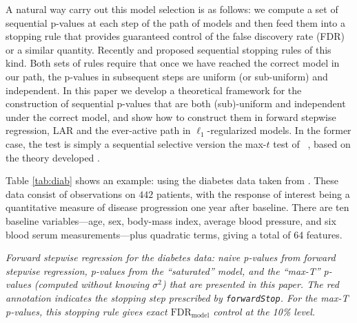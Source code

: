\documentclass{article}
\begin{document}
A natural way carry out this model selection is as follows: we compute a set  of sequential p-values   at each step of the path of models and then feed them into a stopping rule
that provides guaranteed control of the false discovery rate (FDR) or a similar quantity. Recently  \citet{gsell2013sequential} and \citet{li2015accumulation} proposed sequential stopping rules of this kind.
Both sets of rules require that once we have reached the correct model in our path, the p-values in subsequent steps are uniform (or sub-uniform)
and independent.
In this paper we develop a theoretical framework for the construction of sequential p-values  that are both (sub)-uniform and independent under the correct model,
and show how to construct them  in forward stepwise regression, LAR and the ever-active path in $\ell_1$-regularized models.
In the former case, the test is simply a sequential selective version the max-$t$ test of ~\citet{buja2014}, based on the theory developed \citet{fithian2014optimal}.

Table \ref{tab:diab} shows an example: using the diabetes data taken from \cite{LARS}.
These data consist of  observations on $442$ patients, with the response of interest being a quantitative measure of disease progression one year after baseline.
There are ten baseline variables---age, sex, body-mass index, average blood pressure,
and six blood serum measurements---plus quadratic terms, giving a total of 64 features.


\begin{table}[ht]
\centering

\caption[tab:diab]{\em Forward stepwise regression for the diabetes data: naive p-values from forward stepwise regression, 
p-values from the ``saturated'' model, and the ``max-T'' p-values (computed without knowing $\sigma^2$) that are presented in this paper. The red annotation indicates the stopping step
prescribed by {\tt forwardStop}. For the max-T p-values, this stopping rule gives exact $\text{FDR}_{\text{model}}$ control at the 10\% level.}
\label{tab:diab}
\end{table}
\end{document}
